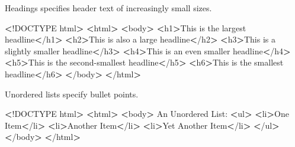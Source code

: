 \documentclass[]{book}
\newenvironment{Shaded}{\begin{snugshade}}{\end{snugshade}}
\newcommand{\OperatorTok}[1]{\textcolor[rgb]{0.81,0.36,0.00}{\textbf{#1}}}
\newcommand{\ExtensionTok}[1]{#1}
\newcommand{\NormalTok}[1]{#1}
\begin{document}
Headings specifies header text of increasingly small sizes.

\begin{Shaded}
\begin{Highlighting}[]
\OperatorTok{<}\NormalTok{!}\ExtensionTok{DOCTYPE}\NormalTok{ html}\OperatorTok{>}         
\OperatorTok{<}\ExtensionTok{html}\OperatorTok{>}                  
    \OperatorTok{<}\ExtensionTok{body}\OperatorTok{>}              
        \OperatorTok{<}\ExtensionTok{h1}\OperatorTok{>}\NormalTok{This is the largest headline}\OperatorTok{<}\NormalTok{/h1}\OperatorTok{>}        
        \OperatorTok{<}\ExtensionTok{h2}\OperatorTok{>}\NormalTok{This is also a large headline}\OperatorTok{<}\NormalTok{/h2}\OperatorTok{>}       
        \OperatorTok{<}\ExtensionTok{h3}\OperatorTok{>}\NormalTok{This is a slightly smaller headline}\OperatorTok{<}\NormalTok{/h3}\OperatorTok{>} 
        \OperatorTok{<}\ExtensionTok{h4}\OperatorTok{>}\NormalTok{This is an even smaller headline}\OperatorTok{<}\NormalTok{/h4}\OperatorTok{>}    
        \OperatorTok{<}\ExtensionTok{h5}\OperatorTok{>}\NormalTok{This is the second-smallest headline}\OperatorTok{<}\NormalTok{/h5}\OperatorTok{>}
        \OperatorTok{<}\ExtensionTok{h6}\OperatorTok{>}\NormalTok{This is the smallest headline}\OperatorTok{<}\NormalTok{/h6}\OperatorTok{>}       
    \OperatorTok{<}\NormalTok{/}\ExtensionTok{body}\OperatorTok{>}             
\OperatorTok{<}\NormalTok{/}\ExtensionTok{html}\OperatorTok{>}                 
\end{Highlighting}
\end{Shaded}

Unordered lists specify bullet points.

\begin{Shaded}
\begin{Highlighting}[]
\OperatorTok{<}\NormalTok{!}\ExtensionTok{DOCTYPE}\NormalTok{ html}\OperatorTok{>}         
\OperatorTok{<}\ExtensionTok{html}\OperatorTok{>}                  
    \OperatorTok{<}\ExtensionTok{body}\OperatorTok{>}              
        \ExtensionTok{An}\NormalTok{ Unordered List:           }
        \OperatorTok{<}\ExtensionTok{ul}\OperatorTok{>}                         
            \OperatorTok{<}\ExtensionTok{li}\OperatorTok{>}\NormalTok{One Item}\OperatorTok{<}\NormalTok{/li}\OperatorTok{>}        
            \OperatorTok{<}\ExtensionTok{li}\OperatorTok{>}\NormalTok{Another Item}\OperatorTok{<}\NormalTok{/li}\OperatorTok{>}    
            \OperatorTok{<}\ExtensionTok{li}\OperatorTok{>}\NormalTok{Yet Another Item}\OperatorTok{<}\NormalTok{/li}\OperatorTok{>}
        \OperatorTok{<}\NormalTok{/}\ExtensionTok{ul}\OperatorTok{>}                        
    \OperatorTok{<}\NormalTok{/}\ExtensionTok{body}\OperatorTok{>}             
\OperatorTok{<}\NormalTok{/}\ExtensionTok{html}\OperatorTok{>}                 
\end{Highlighting}
\end{Shaded}
\end{document}

